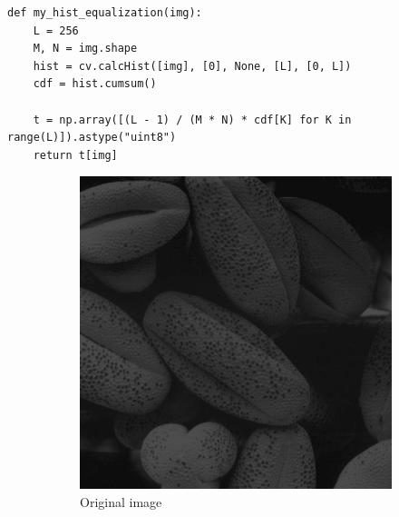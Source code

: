 \documentclass[10pt,a4paper]{article}
\begin{document}
\begin{lstlisting}[caption=Custom histogram equalization function]
def my_hist_equalization(img):
    L = 256
    M, N = img.shape
    hist = cv.calcHist([img], [0], None, [L], [0, L])
    cdf = hist.cumsum()

    t = np.array([(L - 1) / (M * N) * cdf[K] for K in range(L)]).astype("uint8")
    return t[img]

\end{lstlisting}

\begin{figure}[H]
    \centering
    \begin{subfigure}{0.48\textwidth}
        \includegraphics[width=\textwidth]{task5/shells.jpg}
        \caption{Original image}
    \end{subfigure}
    \hfill
    \begin{subfigure}{0.48\textwidth}

\end{subfigure}
\end{figure}
\end{document}
